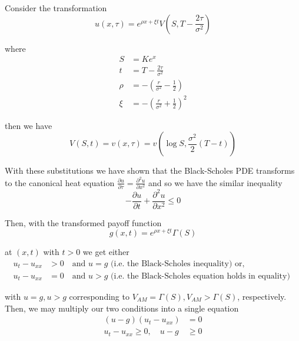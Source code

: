 \documentclass[12pt]{article}
\newlength\tindent
\renewcommand{\indent}{\hspace*{\tindent}}
\begin{document}
Consider the transformation
\begin{equation*}
	u(x, \tau) = e^{\rho x + \xi t} V \left(S, T - \frac{2\tau}{\sigma^2} \right)
\end{equation*}

where
\begin{align*}
	S &= Ke^x \\
	t &= T - \frac{2\tau}{\sigma^2} \\
	\rho &= -\left( \frac{r}{\sigma^2} - \frac{1}{2} \right) \\
	\xi &= -\left( \frac{r}{\sigma^2} + \frac{1}{2} \right)^2
\end{align*}

then we have
\begin{equation*}
	V(S, t) = v(x, \tau) = v \left( \log S, \frac{\sigma^2}{2}(T - t) \right)
\end{equation*}

\indent With these substitutions we have shown that the Black-Scholes PDE transforms to the canonical heat equation $\frac{ \partial u }{ \partial \tau } = \frac{ \partial^2 u }{ \partial x^2 }$ and so we have the similar inequality
\begin{equation*}
	-\frac{\partial u}{\partial t} + \frac{\partial^2 u}{\partial x^2} \leq 0
\end{equation*}

Then, with the transformed payoff function
\begin{equation*}
	g(x, t) = e^{\rho x + \xi t}\Gamma(S)
\end{equation*}

at $(x, t)$ with $t > 0$ we get either
\begin{align*}
	u_t - u_{xx} &> 0 \quad \text{and } u = g  \text{ (i.e. the Black-Scholes inequality) or,} \\
	u_t - u_{xx} &= 0 \quad \text{and } u > g \text{ (i.e. the Black-Scholes equation holds in equality) }
\end{align*}

with $u = g, u > g$ corresponding to $V_{AM} = \Gamma(S), V_{AM} > \Gamma(S)$, respectively. Then, we may multiply our two conditions into a single equation
\begin{align*}
	(u - g)(u_t - u_{xx}) &= 0 \\
	u_t - u_{xx} \geq 0, \quad u - g &\geq 0
\end{align*}
\end{document}
